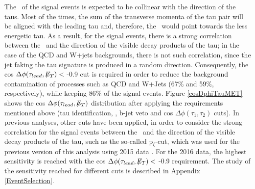  \noindent The \METv~of the signal events is expected to be collinear with 
 the direction of the taus. Most of the times, the sum of the transverse momenta of the tau pair 
 will be aligned with the leading tau and, therefore, the \METv~would
 point towards the less energetic tau. As a result, for the signal events, 
 there is a strong correlation between the \METv~and the direction of the visible 
 decay products of the tau; in the case of the QCD and W+jets backgrounds, there is 
 not such correlation, since the jet faking the tau signature is produced 
 in a random direction. Consequently, the cos $\Delta \phi (\tau_{lead},\not\!\!E_T) <$ -0.9 cut is 
 required in order to reduce the background contamination of processes such as 
 QCD and W+Jets (67$\%$ and 59$\%$, respectively), while keeping 86$\%$ of the 
 signal events. Figure \ref{cosDphiTauMET} shows the cos $\Delta \phi (\tau_{lead},\not\!\!E_T)$
 distribution after applying the requirements mentioned above (tau identification, \MET, b-jet veto
 and cos $\Delta \phi (\tau_{1},\tau_{2})$ cuts). In previous analyses, other cuts have 
 been applied, in order to consider the strong correlation for the signal events between the \METv~and the 
 direction of the visible decay products of the tau, such as the so-called 
 p$_{\zeta}$-cut, which was used for the previous version of this analysis
 using 2015 data \cite{CMSZprimetotautau2015}. For the 2016 data, the highest sensitivity
 is reached with the cos $\Delta \phi (\tau_{lead},\not\!\!E_T) <$ -0.9 requirement. The 
 study of the sensitivity reached for different cuts is described in Appendix \ref{EventSelection}.
    
%  
%  
 
